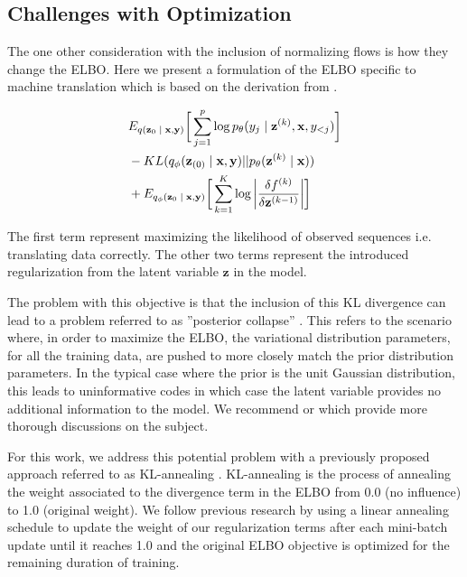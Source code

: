 \subsection{Challenges with Optimization}

The one other consideration with the inclusion of normalizing flows is how they change the ELBO. Here we present a formulation of the ELBO specific to machine translation which is based on the derivation from \citealp[Section 4.2]{rezende2015VIwithNF}.

\begin{align}
\begin{split}\label{eq:2}
&
E_{q(\textbf{z}_{0}\; | \;{\textbf{x}, \textbf{y}})} \bigg[ \sum_{j=1}^{p} \log p_{\theta}(y_{j} \; | \;{\textbf{z}^{(k)}}, \textbf{x}, y_{<j}) \bigg] \\
& - KL(q_{\phi}(\textbf{z}_{(0)} \; | \;{\textbf{x}, \textbf{y}}) || p_{\theta}(\textbf{z}^{(k)} \; | \;{\textbf{x}})) \\
&   +  E_{q_{\phi}(\textbf{z}_{0} \; | \;{\textbf{x}, \textbf{y}})} \bigg[\sum_{k=1}^{K} \log \bigg|\frac{\delta f^{(k)}}{\delta \textbf{z}^{(k-1)}} \bigg| \bigg]  
\end{split}
\end{align}

The first term represent maximizing the likelihood of observed sequences i.e. translating data correctly. The other two terms represent the introduced regularization from the latent variable $\textbf{z}$ in the model. 

The problem with this objective is that the inclusion of this KL divergence can lead to a problem referred to as ''posterior collapse'' \cite{he2018lagging}. This refers to the scenario where, in order to maximize the ELBO, the variational distribution parameters, for all the training data, are pushed to more closely match the prior distribution parameters. In the typical case where the prior is the unit Gaussian distribution, this leads to uninformative codes in which case the latent variable provides no additional information to the model. We recommend \citet{chen2016VariationalLossyAE} or \citet{zhao2017InfoVAE} which provide more thorough discussions on the subject. 

 

For this work, we address this potential problem with a previously proposed approach referred to as KL-annealing \cite{bowman2015GeneratingSent,sonderby2016LadderVAE}. KL-annealing is the process of annealing the weight associated to the divergence term in the ELBO from 0.0 (no influence) to 1.0 (original weight). We follow previous research by using a linear annealing schedule to update the weight of our regularization terms after each mini-batch update until it reaches 1.0 and the original ELBO objective is optimized for the remaining duration of training. 


